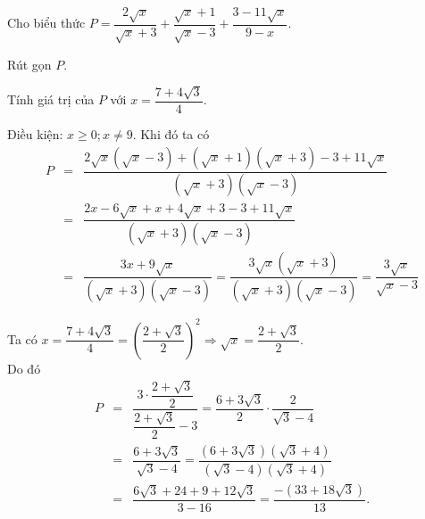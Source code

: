 \begin{bt}%
	Cho biểu thức $P=\dfrac{2\sqrt{x}}{\sqrt{x} + 3} + \dfrac{\sqrt{x} + 1}{\sqrt{x} - 3} + \dfrac{3 - 11\sqrt{x}}{9 - x}$. 
	\begin{listEX}[2]
	\item Rút gọn $P$.
	\item Tính giá trị của $P$ với $x=\dfrac{7 + 4\sqrt{3}}{4}$.
	\end{listEX}
	\loigiai
	{
	\begin{listEX}
	\item Điều kiện: $x\geq 0 ; x\neq 9$. Khi đó ta có
	\allowdisplaybreaks 
	\begin{eqnarray*}
	P&=&\dfrac{2\sqrt{x}(\sqrt{x} - 3) + (\sqrt{x} + 1)(\sqrt{x} + 3) - 3 + 11\sqrt{x}}{(\sqrt{x} + 3)(\sqrt{x} - 3)}\\
	&=&\dfrac{2{x} - 6\sqrt{{x}} + {x} + 4\sqrt{{x}} + 3 - 3 + 11\sqrt{{x}}}{(\sqrt{{x}} + 3)(\sqrt{{x}} - 3)}\\
	&=&\dfrac{3{x} + 9\sqrt{{x}}}{(\sqrt{{x}} + 3)(\sqrt{{x}} - 3)}=\dfrac{3\sqrt{{x}}(\sqrt{{x}} + 3)}{(\sqrt{{x}} + 3)(\sqrt{{x}} - 3)}=\dfrac{3\sqrt{{x}}}{\sqrt{{x}} - 3}
	\end{eqnarray*}
	\item Ta có $x=\dfrac{7 + 4\sqrt{3}}{4}=\left(\dfrac{2 + \sqrt{3}}{2}\right)^2\Rightarrow\sqrt{x}=\dfrac{2 + \sqrt{3}}{2}$.\\ 
	Do đó
	\allowdisplaybreaks
	\begin{eqnarray*}
	P&=&\dfrac{3\cdot\dfrac{2 + \sqrt{3}}{2}}{\dfrac{2 + \sqrt{3}}{2} - 3}=\dfrac{6 + 3\sqrt{3}}{2}\cdot\dfrac{2}{\sqrt{3} - 4}\\
	&=&\dfrac{6 + 3\sqrt{3}}{\sqrt{3} - 4}=\dfrac{(6 + 3\sqrt{3})(\sqrt{3} + 4)}{(\sqrt{3} - 4)(\sqrt{3} + 4)}\\
	&=&\dfrac{6\sqrt{3} + 24 + 9 + 12\sqrt{3}}{3 - 16}=\dfrac{ - (33 + 18\sqrt{3})}{13}.
	\end{eqnarray*}
	\end{listEX}
	}
\end{bt}
